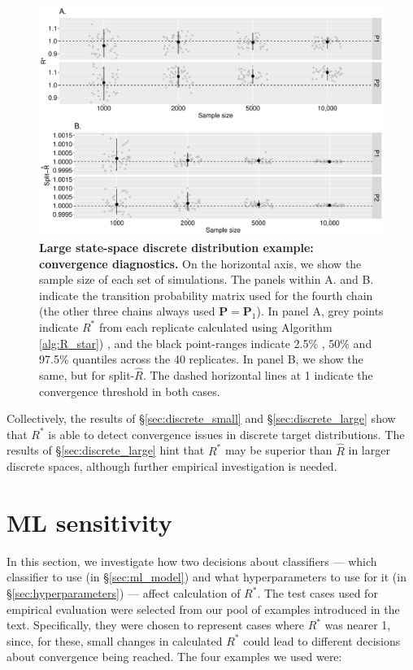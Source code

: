 \documentclass[ba]{imsart}
\numberwithin{equation}{section}
\theoremstyle{plain}
\begin{document}
\begin{supplement}
		\begin{figure}[!htb]
			\centerline{\includegraphics[width=1.0\textwidth]{discrete_higherd.pdf}}
			\caption{\textbf{Large state-space discrete distribution example: convergence diagnostics.} On the horizontal axis, we show the sample size of each set of simulations. The panels within A. and B. indicate the transition probability matrix used for the fourth chain (the other three chains always used $\boldsymbol{P}=\boldsymbol{P}_1$). In panel A, grey points indicate $R^*$ from each replicate calculated using Algorithm \ref{alg:R_star}) , and the black point-ranges indicate 2.5\% , 50\% and 97.5\% quantiles across the 40 replicates. In panel B, we show the same, but for split-$\widehat{R}$. The dashed horizontal lines at 1 indicate the convergence threshold in both cases.}
			\label{fig:discrete_higherd}
		\end{figure}
		
		Collectively, the results of \S\ref{sec:discrete_small} and \S\ref{sec:discrete_large} show that $R^*$ is able to detect convergence issues in discrete target distributions. The results of \S\ref{sec:discrete_large} hint that $R^*$ may be superior than $\widehat{R}$ in larger discrete spaces, although further empirical investigation is needed.
		
		\section{ML sensitivity}\label{sec:ML_sensitivity}
		In this section, we investigate how two decisions about classifiers — which classifier to use (in \S\ref{sec:ml_model}) and what hyperparameters to use for it (in \S\ref{sec:hyperparameters}) — affect calculation of $R^*$. The test cases used for empirical evaluation were selected from our pool of examples introduced in the text. Specifically, they were chosen to represent cases where $R^*$ was nearer 1, since, for these, small changes in calculated $R^*$ could lead to different decisions about convergence being reached. The four examples we used were:
		

\end{supplement}
\end{document}
